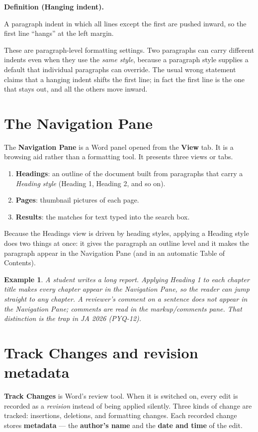 \documentclass[11pt]{article}
\newtheorem{example}{Example}[section]
\newenvironment{definitionbox}[1]{%
  \par\noindent\textbf{Definition (#1).}\ \itshape
}{\par\vspace{0.3em}}
\begin{document}
\begin{definitionbox}{Hanging indent}
A paragraph indent in which all lines except the first are pushed inward, so
the first line ``hangs'' at the left margin.
\end{definitionbox}

These are paragraph-level formatting settings. Two paragraphs can carry
different indents even when they use the \emph{same style}, because a
paragraph style supplies a default that individual paragraphs can override.
The usual wrong statement claims that a hanging indent shifts the first line;
in fact the first line is the one that stays out, and all the others move
inward.

\section{The Navigation Pane}
The \textbf{Navigation Pane} is a Word panel opened from the \textbf{View}
tab. It is a browsing aid rather than a formatting tool. It presents three
views or tabs.

\begin{enumerate}
  \item \textbf{Headings}: an outline of the document built from paragraphs
    that carry a \emph{Heading style} (Heading 1, Heading 2, and so on).
  \item \textbf{Pages}: thumbnail pictures of each page.
  \item \textbf{Results}: the matches for text typed into the search box.
\end{enumerate}

Because the Headings view is driven by heading styles, applying a Heading
style does two things at once: it gives the paragraph an outline level and it
makes the paragraph appear in the Navigation Pane (and in an automatic Table
of Contents).

\begin{example}
A student writes a long report. Applying \emph{Heading 1} to each chapter
title makes every chapter appear in the Navigation Pane, so the reader can
jump straight to any chapter. A reviewer's \emph{comment} on a sentence does
\emph{not} appear in the Navigation Pane; comments are read in the
markup/comments pane. That distinction is the trap in JA 2026 (PYQ-12).
\end{example}

\section{Track Changes and revision metadata}
\textbf{Track Changes} is Word's review tool. When it is switched on, every
edit is recorded as a \emph{revision} instead of being applied silently. Three
kinds of change are tracked: insertions, deletions, and formatting changes.
Each recorded change stores \textbf{metadata} --- the \textbf{author's name}
and the \textbf{date and time} of the edit.
\end{document}
